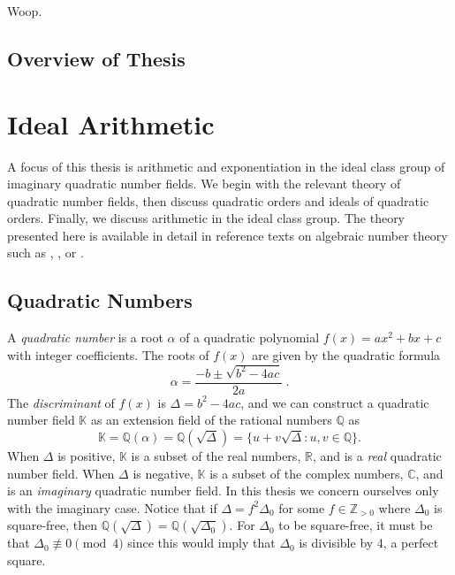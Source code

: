 \documentclass{ucalgthes1}
\theoremstyle{plain}
\theoremstyle{definition}
\newcommand{\CC}{\mathbb{C}}
\newcommand{\RR}{\mathbb{R}}
\newcommand{\KK}{\mathbb{K}}
\newcommand{\QQ}{\mathbb{Q}}
\newcommand{\ZZgtz}{\mathbb{Z}_{>0}}
\begin{document}
Woop.

\section{Overview of Thesis}



\chapter{Ideal Arithmetic}
\label{chap:idealArithmetic}

A focus of this thesis is arithmetic and exponentiation in the ideal class group of imaginary quadratic number fields.  We begin with the relevant theory of quadratic number fields, then discuss quadratic orders and ideals of quadratic orders.  Finally, we discuss arithmetic in the ideal class group.  The theory presented here is available in detail in reference texts on algebraic number theory such as \cite{Cohn1980}, \cite{Hua2012}, or \cite{Ireland1990}. 



\section{Quadratic Numbers}

A \emph{quadratic number} is a root $\alpha$ of a quadratic polynomial $f(x) = ax^2 + bx + c$ with integer coefficients. The roots of $f(x)$ are given by the quadratic formula
\[
	\alpha = \frac{-b \pm \sqrt{b^2 - 4ac}}{2a} ~.
\]
The \emph{discriminant} of $f(x)$ is $\Delta = b^2 - 4ac$, and we can construct a quadratic number field $\KK$ as an extension field of the rational numbers $\QQ$ as
\[
	\KK = \QQ(\alpha) = \QQ(\sqrt{\Delta}) = \{u + v\sqrt{\Delta} : u,v \in \QQ\}.
\]
When $\Delta$ is positive, $\KK$ is a subset of the real numbers, $\RR$, and is a \emph{real} quadratic number field. When $\Delta$ is negative, $\KK$ is a subset of the complex numbers, $\CC$, and is an \emph{imaginary} quadratic number field.  In this thesis we concern ourselves only with the imaginary case.  Notice that if $\Delta = f^2 \Delta_0$ for some $f \in \ZZgtz$ where $\Delta_0$ is square-free, then $\QQ(\sqrt{\Delta}) = \QQ(\sqrt{\Delta_0})$. For $\Delta_0$ to be square-free, it must be that $\Delta_0 \not\equiv 0 \pmod 4$ since this would imply that $\Delta_0$ is divisible by 4, a perfect square.  
\end{document}
